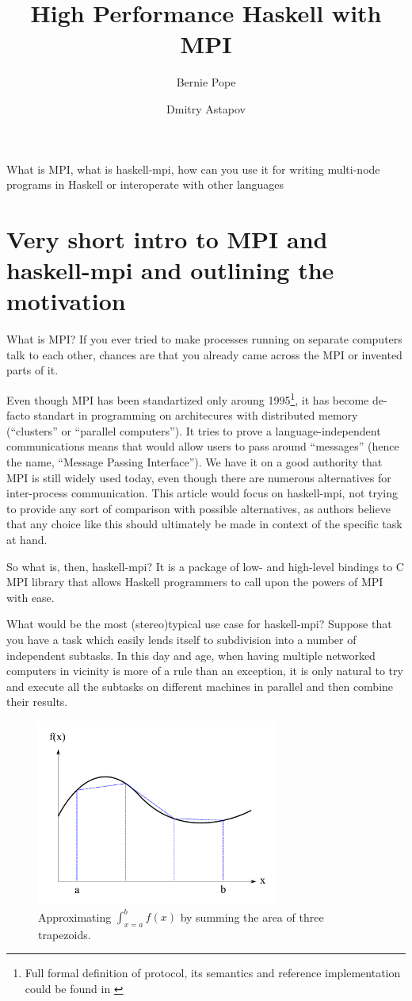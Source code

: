 \documentclass{tmr}
\title{High Performance Haskell with MPI}
\author{Bernie Pope\email{bjpope@unimelb.edu.au}}
\author{Dmitry Astapov\email{dastapov@gmail.com}}
\begin{document}
\begin{introduction} 
What is MPI, what is haskell-mpi, how can you use it for writing multi-node programs in Haskell or interoperate with other languages
\end{introduction}

\section{Very short intro to MPI and haskell-mpi and outlining the motivation}
What is MPI? If you ever tried to make processes running on separate
computers talk to each other, chances are that you already came across
the MPI or invented parts of it. 

Even though MPI has been standartized only aroung 1995\footnote{Full
  formal definition of protocol, its semantics and reference
  implementation could be found in \cite{mpi-report}}, it has become
de-facto standart in programming on architecures with distributed
memory (``clusters'' or ``parallel computers''). It tries to prove a
language-independent communications means that would allow users to
pass around ``messages'' (hence the name, ``Message Passing
Interface''). We have it on a good authority that MPI is still widely
used today, even though there are numerous alternatives for
inter-process communication. This article would focus on haskell-mpi,
not trying to provide any sort of comparison with possible
alternatives, as authors believe that any choice like this should
ultimately be made in context of the specific task at hand.

So what is, then, haskell-mpi? It is a package of low- and high-level bindings
to C MPI library that allows Haskell programmers to call upon the
powers of MPI with ease. 

What would be the most (stereo)typical use case for haskell-mpi?
Suppose that you have a task which easily lends itself to subdivision
into a number of independent subtasks. In this day and age, when
having multiple networked computers in vicinity is more of a rule than
an exception, it is only natural to try and execute all the subtasks
on different machines in parallel and then combine their results.

\begin{figure}[t]
\centering
\includegraphics[width=8cm]{integral_diag.pdf}
\caption{Approximating $\int_{x=a}^{b} f(x)$ by summing the area of three trapezoids. }
\end{figure}
\end{document}
